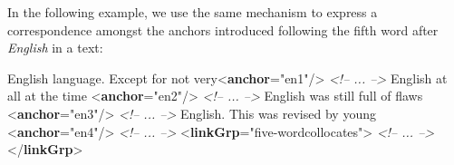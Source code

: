 In the following example, we use the same mechanism to express a correspondence amongst the anchors introduced following the fifth word after \textit{English} in a text: \par\bgroup{}\exampleFont \begin{shaded}\noindent\mbox{}English language. Except for not very{<\textbf{anchor}\hspace*{1em}{xml:id}="{en1}"/>}\mbox{}\newline 
\textit{<!-- ... -->}\mbox{}\newline 
 English at all at the time\mbox{}\newline 
{<\textbf{anchor}\hspace*{1em}{xml:id}="{en2}"/>}\mbox{}\newline 
\textit{<!-- ... -->}\mbox{}\newline 
 English was still full of flaws\mbox{}\newline 
{<\textbf{anchor}\hspace*{1em}{xml:id}="{en3}"/>}\mbox{}\newline 
\textit{<!-- ... -->}\mbox{}\newline 
 English. This was revised by young\mbox{}\newline 
{<\textbf{anchor}\hspace*{1em}{xml:id}="{en4}"/>}\mbox{}\newline 
\textit{<!-- ... -->}\mbox{}\newline 
{<\textbf{linkGrp}\hspace*{1em}{type}="{five-word\textunderscore collocates}">}\mbox{}\newline 
{}\mbox{}\newline 
\textit{<!-- ... -->}\mbox{}\newline 
{</\textbf{linkGrp}>}\end{shaded}\egroup\par 
